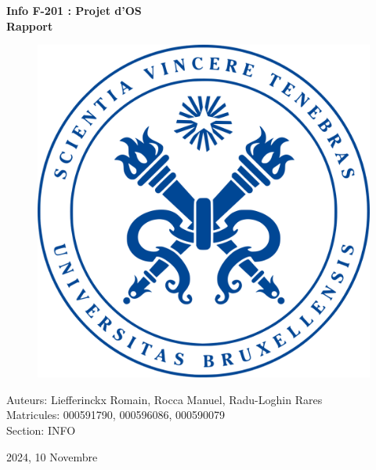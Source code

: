 \documentclass[utf8]{article}
\begin{document}
\begin{titlepage}
    \centering
    
    \vspace*{1cm}
    {\huge \bfseries Info F-201 : Projet d’OS \\
                    Rapport \par}
    
    \vfill
    
    \begin{figure}[h]
        \centering
        \includegraphics[scale=0.2]{logo.png}
    \end{figure}
    
    \vfill
    
    {\large Auteurs: Liefferinckx Romain, Rocca Manuel, Radu-Loghin Rares\\ 
            Matricules: 000591790, 000596086, 000590079 \\ 
            Section: INFO \par}
    {\large 2024, 10 Novembre \par}
\end{titlepage}
\end{document}
